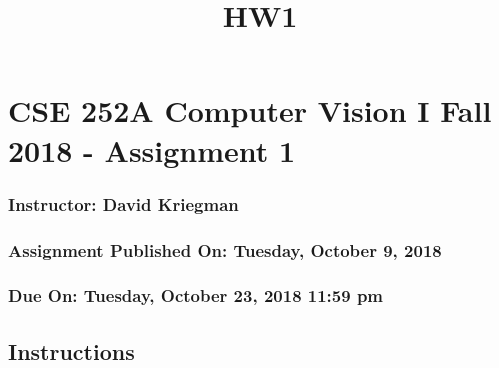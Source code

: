 \documentclass[11pt]{article}
\title{HW1}
\begin{document}
    
    
    \maketitle
    
    

    
    \hypertarget{cse-252a-computer-vision-i-fall-2018---assignment-1}{%
\section{CSE 252A Computer Vision I Fall 2018 - Assignment
1}\label{cse-252a-computer-vision-i-fall-2018---assignment-1}}

\hypertarget{instructor-david-kriegman}{%
\subsubsection{Instructor: David
Kriegman}\label{instructor-david-kriegman}}

\hypertarget{assignment-published-on-tuesday-october-9-2018}{%
\subsubsection{Assignment Published On: Tuesday, October 9,
2018}\label{assignment-published-on-tuesday-october-9-2018}}

\hypertarget{due-on-tuesday-october-23-2018-1159-pm}{%
\subsubsection{Due On: Tuesday, October 23, 2018 11:59
pm}\label{due-on-tuesday-october-23-2018-1159-pm}}

\hypertarget{instructions}{%
\subsection{Instructions}\label{instructions}}
\end{document}
